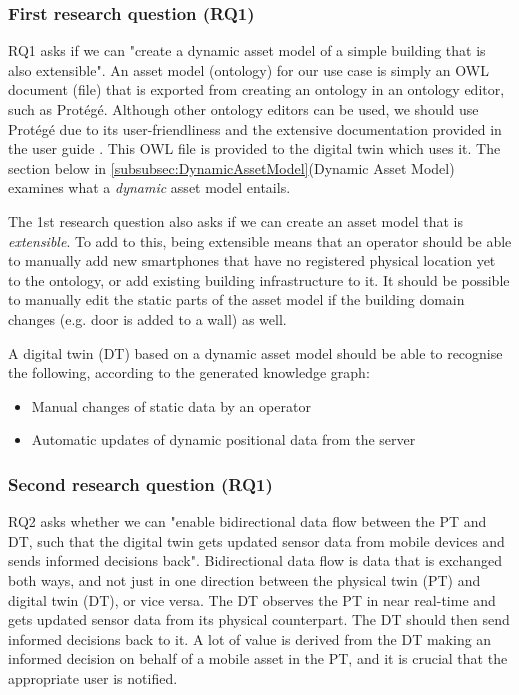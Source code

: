 \documentclass{article}
\begin{document}
\subsubsection{First research question (RQ1)}
RQ1 asks if we can "create a dynamic asset model of a simple building that is also extensible". An asset model (ontology) for our use case is simply an OWL document (file) that is exported from creating an ontology in an ontology editor, such as Protégé. Although other ontology editors can be used, we should use Protégé due to its user-friendliness and the extensive documentation provided in the user guide \cite{horridge_practical_2011}. This OWL file is provided to the digital twin which uses it. The section below in \ref{subsubsec:DynamicAssetModel}(Dynamic Asset Model) examines what a \emph{dynamic} asset model entails. 

The 1st research question also asks if we can create an asset model that is \emph{extensible}. To add to this, being extensible means that an operator should be able to manually add new smartphones that have no registered physical location yet to the ontology, or add existing building infrastructure to it. It should be possible to manually edit the static parts of the asset model if the building domain changes (e.g. door is added to a wall) as well. 

A digital twin (DT) based on a dynamic asset model should be able to recognise the following, according to the generated knowledge graph:
\begin{itemize}
    \item Manual changes of static data by an operator
    \item Automatic updates of dynamic positional data from the server
\end{itemize}

\subsubsection{Second research question (RQ1)}
RQ2 asks whether we can "enable bidirectional data flow between the PT and DT, such that the digital twin gets updated sensor data from mobile devices and sends informed decisions back". Bidirectional data flow is data that is exchanged both ways, and not just in one direction between the physical twin (PT) and digital twin (DT), or vice versa. The DT observes the PT in near real-time and gets updated sensor data from its physical counterpart. The DT should then send informed decisions back to it. A lot of value is derived from the DT making an informed decision on behalf of a mobile asset in the PT, and it is crucial that the appropriate user is notified.
\end{document}

